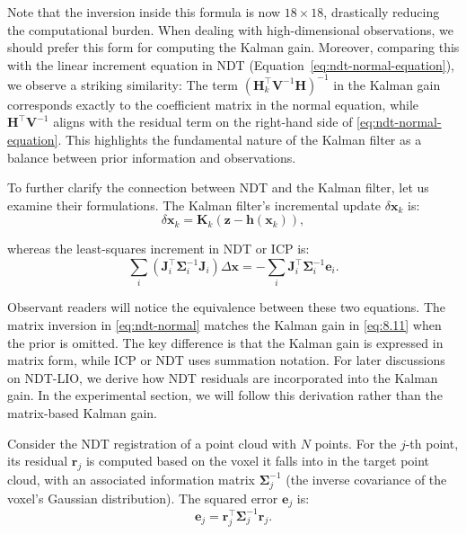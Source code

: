 Note that the inversion inside this formula is now \( 18 \times 18 \), drastically reducing the computational burden. When dealing with high-dimensional observations, we should prefer this form for computing the Kalman gain. Moreover, comparing this with the linear increment equation in NDT (Equation~\eqref{eq:ndt-normal-equation}), we observe a striking similarity: The term \((\mathbf{H}_k^\top \mathbf{V}^{-1} \mathbf{H})^{-1}\) in the Kalman gain corresponds exactly to the coefficient matrix in the normal equation, while \(\mathbf{H}^\top \mathbf{V}^{-1}\) aligns with the residual term on the right-hand side of \eqref{eq:ndt-normal-equation}. This highlights the fundamental nature of the Kalman filter as a balance between prior information and observations.  

To further clarify the connection between NDT and the Kalman filter, let us examine their formulations. The Kalman filter's incremental update \(\delta \mathbf{x}_k\) is:  
\begin{equation}\label{eq:kalman-delta-x}  
	\delta \mathbf{x}_k = \mathbf{K}_k (\mathbf{z} - \mathbf{h}(\mathbf{x}_k)),  
\end{equation}  

whereas the least-squares increment in NDT or ICP is:  
\begin{equation}\label{eq:ndt-normal}  
	\sum_{i} (\mathbf{J}_i^\top \boldsymbol{\Sigma}_i^{-1} \mathbf{J}_i) \Delta \mathbf{x} = -\sum_{i} \mathbf{J}_i^\top \boldsymbol{\Sigma}^{-1}_i \mathbf{e}_i.  
\end{equation}  

Observant readers will notice the equivalence between these two equations. The matrix inversion in \eqref{eq:ndt-normal} matches the Kalman gain in \eqref{eq:8.11} when the prior is omitted. The key difference is that the Kalman gain is expressed in matrix form, while ICP or NDT uses summation notation. For later discussions on NDT-LIO, we derive how NDT residuals are incorporated into the Kalman gain. In the experimental section, we will follow this derivation rather than the matrix-based Kalman gain.  

Consider the NDT registration of a point cloud with \( N \) points. For the \( j \)-th point, its residual \(\mathbf{r}_j\) is computed based on the voxel it falls into in the target point cloud, with an associated information matrix \(\boldsymbol{\Sigma}^{-1}_j\) (the inverse covariance of the voxel's Gaussian distribution). The squared error \(\mathbf{e}_j\) is:  
\begin{equation}\label{key}  
	\mathbf{e}_j = \mathbf{r}_j^\top \boldsymbol{\Sigma}^{-1}_j \mathbf{r}_j.  
\end{equation}  

